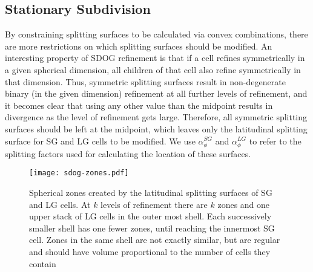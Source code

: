\subsection{Stationary Subdivision} \label{sec:method-stationary}
By constraining splitting surfaces to be calculated via convex combinations, there are more restrictions on which splitting surfaces should be modified.
An interesting property of SDOG refinement is that if a cell refines symmetrically in a given spherical dimension, all children of that cell also refine symmetrically in that dimension.
Thus, symmetric splitting surfaces result in non-degenerate binary (in the given dimension) refinement at all further levels of refinement, and it becomes clear that using any other value than the midpoint results in divergence as the level of refinement gets large.
Therefore, all symmetric splitting surfaces should be left at the midpoint, which leaves only the latitudinal splitting surface for SG and LG cells to be modified.
We use $\alpha_{\phi}^{SG}$ and $\alpha_{\phi}^{LG}$ to refer to the splitting factors used for calculating the location of these surfaces.


\begin{figure}[tb]
	\texttt{[image: sdog-zones.pdf]}
	\caption[Title]{
		Spherical zones created by the latitudinal splitting surfaces of SG and LG cells.
		At $k$ levels of refinement there are $k$ zones and one upper stack of LG cells in the outer most shell.
		Each successively smaller shell has one fewer zones, until reaching the innermost SG cell.
		Zones in the same shell are not exactly similar, but are regular and should have volume proportional to the number of cells they contain
	}
	\label{fig:sdog-zones}
\end{figure}



